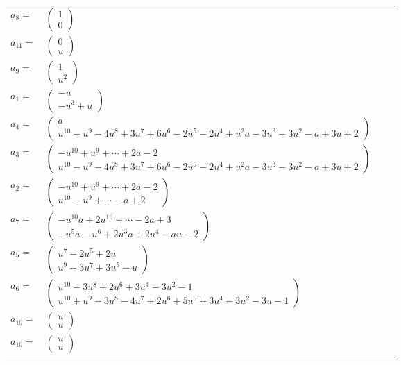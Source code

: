 \documentclass[1p]{elsarticle_modified}
\theoremstyle{definition}
\begin{document}
\begin{tabular}{m{7pt} m{180pt} m{7pt} m{180pt} }
\flushright $a_{8}=$&$\begin{pmatrix}1\\0\end{pmatrix}$ \\
\flushright $a_{11}=$&$\begin{pmatrix}0\\u\end{pmatrix}$ \\
\flushright $a_{9}=$&$\begin{pmatrix}1\\u^2\end{pmatrix}$ \\
\flushright $a_{1}=$&$\begin{pmatrix}- u\\- u^3+u\end{pmatrix}$ \\
\flushright $a_{4}=$&$\begin{pmatrix}a\\u^{10}- u^9-4 u^8+3 u^7+6 u^6-2 u^5-2 u^4+u^2 a-3 u^3-3 u^2- a+3 u+2\end{pmatrix}$ \\
\flushright $a_{3}=$&$\begin{pmatrix}- u^{10}+u^9+\cdots+2 a-2\\u^{10}- u^9-4 u^8+3 u^7+6 u^6-2 u^5-2 u^4+u^2 a-3 u^3-3 u^2- a+3 u+2\end{pmatrix}$ \\
\flushright $a_{2}=$&$\begin{pmatrix}- u^{10}+u^9+\cdots+2 a-2\\u^{10}- u^9+\cdots- a+2\end{pmatrix}$ \\
\flushright $a_{7}=$&$\begin{pmatrix}- u^{10} a+2 u^{10}+\cdots-2 a+3\\- u^5 a- u^6+2 u^3 a+2 u^4- a u-2\end{pmatrix}$ \\
\flushright $a_{5}=$&$\begin{pmatrix}u^7-2 u^5+2 u\\u^9-3 u^7+3 u^5- u\end{pmatrix}$ \\
\flushright $a_{6}=$&$\begin{pmatrix}u^{10}-3 u^8+2 u^6+3 u^4-3 u^2-1\\u^{10}+u^9-3 u^8-4 u^7+2 u^6+5 u^5+3 u^4-3 u^2-3 u-1\end{pmatrix}$ \\
\flushright $a_{10}=$&$\begin{pmatrix}u\\u\end{pmatrix}$\\ \flushright $a_{10}=$&$\begin{pmatrix}u\\u\end{pmatrix}$\\&\end{tabular}
\end{document}
